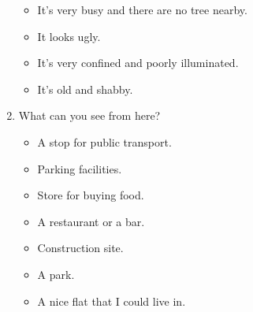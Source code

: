 \documentclass[letterpaper]{article}
\begin{document}
\begin{enumerate}
\begin{itemize}
		\item It's very busy and there are no tree nearby.
		\item It looks ugly.
		\item It's very confined and poorly illuminated.
		\item It's old and shabby.
	\end{itemize}
	\item What can you see from here?
	\begin{itemize}
		\item A stop for public transport.
		\item Parking facilities.
		\item Store for buying food.
		\item A restaurant or a bar.
		\item Construction site.
		\item A park.
		\item A nice flat that I could live in.
	\end{itemize}
\end{enumerate}
\end{document}
